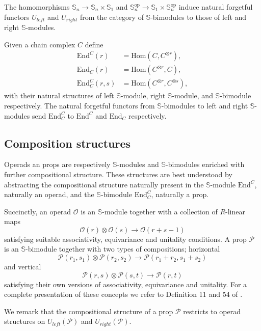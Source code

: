 \documentclass{amsart}
\renewcommand{\S}{\mathbb{S}}
\newcommand{\End}{\mathrm{End}}
\newcommand{\Hom}{\mathrm{Hom}}
\newcommand{\op}{\mathrm{op}}
\newcommand{\Uleft}{U_{left}}
\newcommand{\Uright}{U_{right}}
\begin{document}
The homomorphisms $\S_n \to \S_n \times \S_1$ and $\S_n^\op \to \S_1 \times \S_n^\op$ induce natural forgetful functors $\Uleft$ and $\Uright$ from the category of $\S$-bimodules to those of left and right $\S$-modules.

Given a chain complex $C$ define
\begin{align*}
\End^C(r) &= \Hom(C, C^{\otimes r}), \\
\End_C(r) &= \Hom(C^{\otimes r}, C), \\
\End^C_C(r, s) &= \Hom(C^{\otimes r}, C^{\otimes s}),
\end{align*}
with their natural structures of left $\S$-module, right $\S$-module, and $\S$-bimodule respectively.
The natural forgetful functors from $\S$-bimodules to left and right $\S$-modules send $\End^C_C$ to $\End^C$ and $\End_C$ respectively.

\subsection{Composition structures}

Operads an props are respectively $\S$-modules and \mbox{$\S$-bimodules} enriched with further compositional structure. These structures are best understood by abstracting the compositional structure naturally present in the $\S$-module $\End^C$, naturally an operad, and the $\S$-bimodule $\End^C_C$, naturally a prop.

Succinctly, an operad $\mathcal O$ is an $\S$-module together with a collection of $R$-linear maps
\begin{equation*}
\mathcal O(r) \otimes \mathcal O(s) \to \mathcal O(r+s-1)
\end{equation*}
satisfying suitable associativity, equivariance and unitality conditions.
A prop $\mathcal P$ is an $\S$-bimodule together with two types of compositions; horizontal
\begin{equation*}
\mathcal P(r_1, s_1) \otimes \mathcal P(r_2, s_2) \to \mathcal P(r_1 + r_2, s_1 + s_2)
\end{equation*}
and vertical
\begin{equation*}
\mathcal P(r,s) \otimes \mathcal P(s, t) \to \mathcal P(r, t)
\end{equation*}
satisfying their own versions of associativity, equivariance and unitality.
For a complete presentation of these concepts we refer to Definition 11 and 54 of \cite{Markl08}.

We remark that the compositional structure of a prop $\mathcal P$ restricts to operad structures on $\Uleft(\mathcal P)$ and $\Uright(\mathcal P)$.
\end{document}
